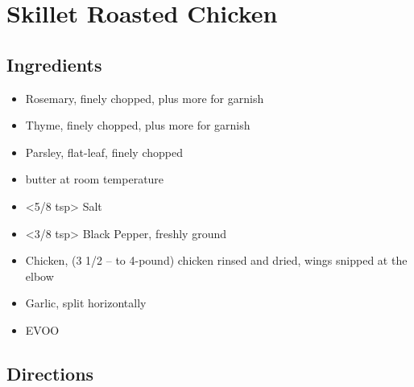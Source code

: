 \section{Skillet Roasted Chicken}

\subsection{ Ingredients }

\begin{itemize}
  \item <3 sprigs> Rosemary, finely chopped, plus more for garnish
  \item <6 sprigs> Thyme, finely chopped, plus more for garnish
  \item <8 sprigs> Parsley, flat-leaf, finely chopped
  \item <4 tbs> butter at room temperature
  \item <5/8 tsp> Salt
  \item <3/8 tsp> Black Pepper, freshly ground
  \item <2 lbs> Chicken, (3 1/2 – to 4-pound) chicken rinsed and dried, wings snipped at the elbow
  \item <3 head of garlic> Garlic, split horizontally
  \item <3 tbs> EVOO
\end{itemize}

\subsection{ Directions }

